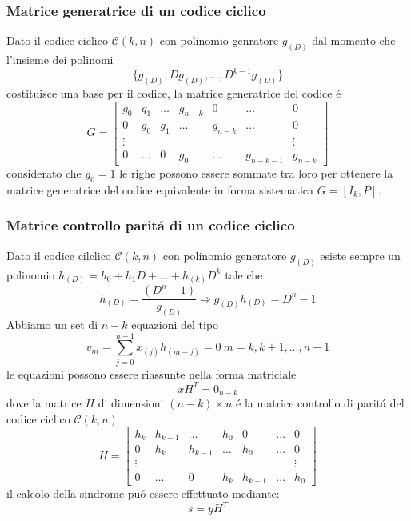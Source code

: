         \subsubsection{Matrice generatrice di un codice ciclico}
            Dato il codice ciclico $\mathcal{C}(k,n)$ con polinomio genratore $g_{(D)}$ dal momento che l'insieme dei polinomi
            \[
                \{g_{(D)},Dg_{(D)},\dots,D^{k-1}g_{(D)}\}  
            \]
            costituisce una base per il codice, la matrice generatrice del codice é 
            \[
                G = 
                \begin{bmatrix}
                g_0 & g_1 & \dots & g_{n-k} & 0 & \dots & 0\\ 
                0 & g_0 & g_1 & \dots & g_{n-k} & \dots & 0\\ 
                \vdots &  &  &  &  &  & \vdots\\ 
                0 & \dots & 0 & g_{0} & \dots & g_{n-k-1} & g_{n-k}
                \end{bmatrix}
            \]
            considerato che $g_0 = 1$ le righe possono essere sommate tra loro per ottenere la matrice generatrice del codice 
            equivalente in forma sistematica $G = [I_k,P]$.
        \subsubsection{Matrice controllo paritá di un codice ciclico}
            Dato il codice cilclico $\mathcal{C}(k,n)$ con polinomio generatore $g_{(D)}$ esiste sempre un polinomio 
            $h_{(D)} = h_0+h_1D+\dots+h_{(k)}D^k$ tale che 
            \[
                h_{(D)} = \frac{(D^n-1)}{g_{(D)}} \Rightarrow g_{(D)}h_{(D)} = D^n-1    
            \]
            Abbiamo un set di $n-k$ equazioni del tipo 
            \[
                v_m =  \sum_{j=0}^{n-1}x_{(j)}h_{(m-j)} = 0\ m=k,k+1,\dots,n-1  
            \]
            le equazioni possono essere riassunte nella forma matriciale
            \[
                xH^T=0_{n-k}  
            \]
            dove la matrice $H$ di dimensioni $(n-k)\times n$ é la matrice controllo di paritá del codice ciclico $\mathcal{C}(k,n)$ 
            \[
                H = 
                \begin{bmatrix}
                h_k & h_{k-1} & \dots & h_{0} & 0 & \dots & 0\\ 
                0 & h_k & h_{k-1} & \dots & h_{0} & \dots & 0\\ 
                \vdots &  &  &  &  &  & \vdots\\ 
                0 & \dots & 0 & h_{k}& h_{k-1} & \dots  & h_0
                \end{bmatrix}
            \]
            il calcolo della sindrome puó essere effettuato mediante:
            \[
                s = yH^T    
            \]
